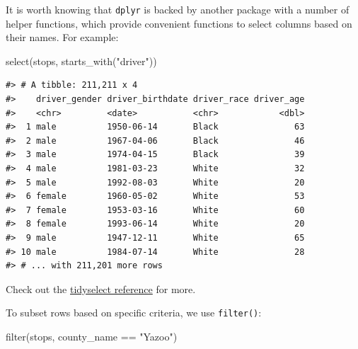 \documentclass[
]{book}
\newenvironment{Shaded}{\begin{snugshade}}{\end{snugshade}}
\newcommand{\FunctionTok}[1]{\textcolor[rgb]{0.00,0.00,0.00}{#1}}
\newcommand{\NormalTok}[1]{#1}
\newcommand{\SpecialCharTok}[1]{\textcolor[rgb]{0.00,0.00,0.00}{#1}}
\newcommand{\StringTok}[1]{\textcolor[rgb]{0.31,0.60,0.02}{#1}}
\begin{document}
It is worth knowing that \texttt{dplyr} is backed by another package with a number of helper functions, which provide convenient functions to select columns based on their names. For example:

\begin{Shaded}
\begin{Highlighting}[]
\FunctionTok{select}\NormalTok{(stops, }\FunctionTok{starts\_with}\NormalTok{(}\StringTok{"driver"}\NormalTok{))}
\end{Highlighting}
\end{Shaded}

\begin{verbatim}
#> # A tibble: 211,211 x 4
#>    driver_gender driver_birthdate driver_race driver_age
#>    <chr>         <date>           <chr>            <dbl>
#>  1 male          1950-06-14       Black               63
#>  2 male          1967-04-06       Black               46
#>  3 male          1974-04-15       Black               39
#>  4 male          1981-03-23       White               32
#>  5 male          1992-08-03       White               20
#>  6 female        1960-05-02       White               53
#>  7 female        1953-03-16       White               60
#>  8 female        1993-06-14       White               20
#>  9 male          1947-12-11       White               65
#> 10 male          1984-07-14       White               28
#> # ... with 211,201 more rows
\end{verbatim}

Check out the \href{https://tidyselect.r-lib.org/reference/language.html}{tidyselect reference} for more.

To subset rows based on specific criteria, we use \texttt{filter()}:

\begin{Shaded}
\begin{Highlighting}[]
\FunctionTok{filter}\NormalTok{(stops, county\_name }\SpecialCharTok{==} \StringTok{"Yazoo"}\NormalTok{)}
\end{Highlighting}
\end{Shaded}
\end{document}
